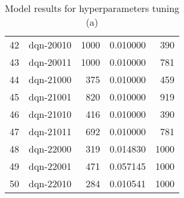 \documentclass{article}
\begin{document}
\begin{table}
\begin{tabular}{llrrr}
42  &            dqn-20010 &            1000 &   0.010000 &               390 \\
43  &            dqn-20011 &            1000 &   0.010000 &               781 \\
44  &            dqn-21000 &             375 &   0.010000 &               459 \\
45  &            dqn-21001 &             820 &   0.010000 &               919 \\
46  &            dqn-21010 &             416 &   0.010000 &               390 \\
47  &            dqn-21011 &             692 &   0.010000 &               781 \\
48  &            dqn-22000 &             319 &   0.014830 &              1000 \\
49  &            dqn-22001 &             471 &   0.057145 &              1000 \\
50  &            dqn-22010 &             284 &   0.010541 &              1000 \\
\bottomrule
\end{tabular}
\label{table:res_basecase}
\caption{Model results for hyperparameters tuning (a)}
\end{table}
\end{document}
